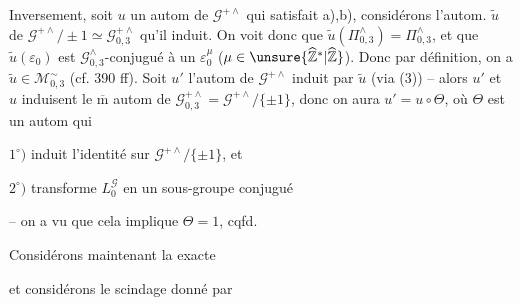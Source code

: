 Inversement, soit $u$ un autom de $\mathcal{G}^{+\wedge}$ qui
satisfait a),b), considérons l'autom. $\widetilde{u}$ de
$\mathcal{G}^{+\wedge}/\!\pm1\simeq\mathcal{G}_{0,3}^{+\wedge}$
qu'il induit. On voit donc
que $\widetilde{u}(\Pi_{0,3}^{\wedge})=\Pi_{0,3}^{\wedge}$, et que
$\widetilde{u}(\varepsilon_{0})$ est $\mathcal{G}_{0,3}^{\wedge}$-conjugué
à un $\varepsilon_{0}^{\mu}$ ($\mu\in\unsure{\widehat{\mathbb{Z}}^{*}|\widehat{\mathbb{Z}}}$).
 Donc par
définition, on a $\widetilde{u}\in\mathcal{M}_{0,3}^{\sim}$
(cf.  390 ff).
Soit $u'$ l'autom de $\mathcal{G}^{+\wedge}$ induit par $\widetilde{u}$
(via (3)) -- alors $u'$ et $u$ induisent le $\overline{\mathrm m}$
autom de $\mathcal{G}_{0,3}^{+\wedge}=\mathcal{G}^{+\wedge}/\{\pm1\}$,
donc on aura $u'=u\circ\Theta$, où
$\Theta$ est un autom qui

$1^\circ)$ induit l'identité sur $\mathcal{G}^{+\wedge}/\{\pm1\}$, et

$2^\circ)$ transforme $L_{0}^{\mathcal{G}}$ en un sous-groupe conjugué

-- on a vu que cela implique $\Theta=1$, cqfd.

Considérons maintenant la 
exacte




et considérons le scindage donné par


